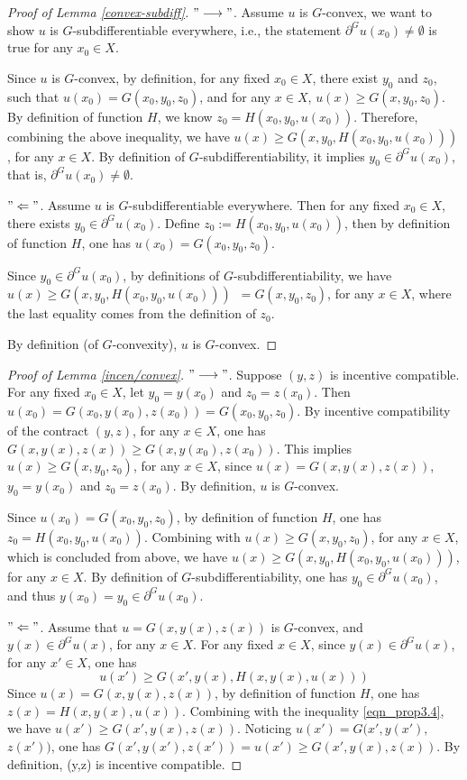 \documentclass[a4paper, 11pt]{amsart}
\numberwithin{equation}{section}
\theoremstyle{plain}
\theoremstyle{definition}
\theoremstyle{remark}
\begin{document}
\begin{proof}[Proof of Lemma \ref{convex-subdiff}]
$"\longrightarrow"$. Assume $u$ is $G$-convex, we want to show $u$ is $G$-subdifferentiable everywhere, i.e., the statement $\partial^G u(x_0)\neq \emptyset$ is true for any $ x_0\in X$.

Since $u$ is $G$-convex, by definition, for any fixed $x_0 \in X$, there exist $y_0$ and $z_0$, such that $u(x_0) = G(x_0,y_0,z_0)$, and for any $x \in X$, $u(x)\ge G(x, y_0, z_0)$. By definition of function $H$, we know $z_0 = H(x_0,y_0,u(x_0))$. Therefore, combining the above inequality, we have $u(x) \ge G(x, y_0, H(x_0,y_0,u(x_0)))$, for any $x \in X$. By definition of $G$-subdifferentiability, it implies $y_0 \in \partial^G u(x_0)$, that is, $\partial^G u(x_0) \neq \emptyset$.


$"\Leftarrow"$. Assume $u$ is $G$-subdifferentiable everywhere. Then for any fixed $x_0 \in X$, there exists $y_0 \in \partial^G u(x_0)$. Define $z_0:=H(x_0,y_0,u(x_0))$, then by definition of function $H$, one has $u(x_0) = G(x_0, y_0, z_0)$.

Since $y_0\in \partial^G u(x_0)$, by definitions of $G$-subdifferentiability, we have $u(x)\ge G(x,y_0,H(x_0,y_0,u(x_0)))$\ $ = G(x,y_0,z_0)$, for any $x\in X$, where the last equality comes from the definition of $z_0$.

By definition (of $G$-convexity), $u$ is $G$-convex.
\end{proof}
\vspace{0.3cm}
\begin{proof}[Proof of Lemma \ref{incen/convex}]
$"\longrightarrow"$. Suppose $(y,z)$ is incentive compatible. For any fixed $x_0 \in X$, let $y_0 = y(x_0)$ and $z_0 = z(x_0)$. Then $u(x_0) = G(x_0, y(x_0), z(x_0)) = G(x_0, y_0, z_0)$. By incentive compatibility of the contract $(y,z)$, for any $x\in X$, one has $G(x, y(x), z(x)) \ge G(x, y(x_0), z(x_0))$. This implies $u(x) \ge G(x,y_0,z_0)$, for any $x\in X$, since $u(x)= G(x, y(x), z(x))$,  $y_0 = y(x_0)$ and $z_0 = z(x_0)$. By definition, $u$ is $G$-convex. 

Since $u(x_0)=G(x_0, y_0, z_0)$, by definition of function $H$, one has $z_0 = H(x_0, y_0, u(x_0))$.  Combining with $u(x) \ge G(x, y_0, z_0)$,  for any $x\in X$, which is concluded from above, we have $u(x)\ge G(x, y_0, H(x_0, y_0, u(x_0)))$, for any $x\in X$. By definition of  $G$-subdifferentiability, one has $y_0 \in \partial^G u(x_0)$, and thus $y(x_0) = y_0 \in \partial^G u(x_0)$.

$"\Leftarrow"$. Assume that $u = G(x, y(x),z(x))$ is $G$-convex, and $y(x)\in \partial^G u(x)$, for any $x\in X$. For any fixed $x \in X$, since $y(x)\in \partial^G u(x)$, for any $x'\in X$, one has 
\begin{equation}\label{eqn_prop3.4}
	u(x')\ge G(x', y(x), H(x, y(x), u(x)))
\end{equation} 
Since $u(x) = G(x, y(x),z(x))$, by definition of function $H$, one has $z(x) = H(x,y(x), u(x))$. Combining with the inequality \eqref{eqn_prop3.4}, we have $u(x')\ge G(x', y(x), z(x))$. Noticing $u(x') = G(x',y(x'),$ $z(x')) $, one has $G(x',y(x'),z(x')) = u(x') \ge G(x', y(x), z(x))$.
By definition, (y,z) is incentive compatible.
\end{proof}
\end{document}
